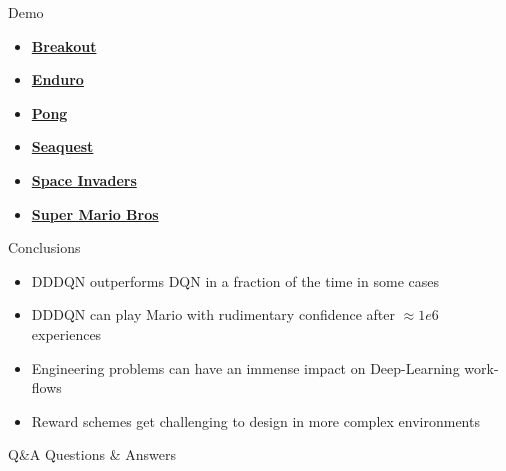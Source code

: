 \documentclass{beamer}
\begin{document}
\begin{frame}{Demo}
\begin{itemize}
\item{\href{https://youtu.be/6zf201DJrw0}{\textbf{Breakout}}}
\item{\href{https://youtu.be/6gAyvNIR-nk}{\textbf{Enduro}}}
\item{\href{https://youtu.be/MbYwTWhgMuE}{\textbf{Pong}}}
\item{\href{https://youtu.be/x12iHhEAOdg}{\textbf{Seaquest}}}
\item{\href{https://youtu.be/Zm6RGYQlTsU}{\textbf{Space Invaders}}}
\item{\href{https://youtu.be/H1Vmr5pm9B0}{\textbf{Super Mario Bros}}}
\end{itemize}
\end{frame}

\begin{frame}{Conclusions}
\begin{itemize}
    \item{DDDQN outperforms DQN in a fraction of the time in some cases}
    \item{DDDQN can play Mario with rudimentary confidence after $\approx 1e6$ experiences}
    \item{Engineering problems can have an immense impact on Deep-Learning work-flows}
    \item{Reward schemes get challenging to design in more complex environments}
\end{itemize}
\end{frame}

\begin{frame}{Q\&A}
\centering
Questions \& Answers
\end{frame}
\end{document}
